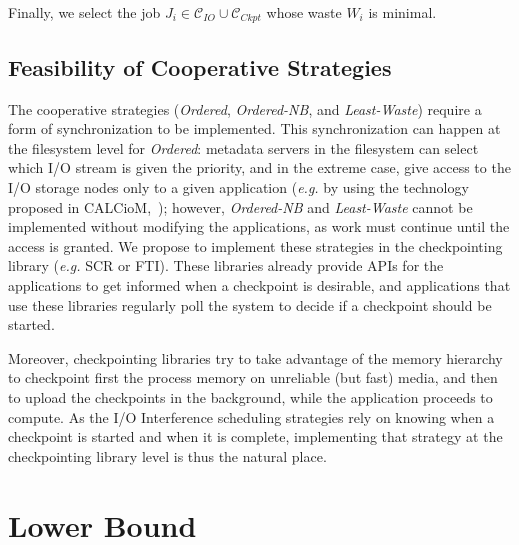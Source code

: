 \documentclass[conference,nofonttune]{IEEEtran}
\newcommand{\eg}[0]{\emph{e.g.}\xspace}
\newcommand{\wap}[1]{W_{#1}}
\newcommand{\Catiocat}{\mathcal{C}_{IO}\xspace}
\newcommand{\Catckptcat}{\mathcal{C}_{Ckpt}\xspace}
\newcommand{\fifoblock}{\emph{Ordered}\xspace}
\newcommand{\fifononblock}{\emph{Ordered-NB}\xspace}
\newcommand{\leastwaste}{\emph{Least-Waste}\xspace}
\begin{document}
Finally, we select the job $J_{i} \in \Catiocat \cup \Catckptcat$
whose waste $\wap{i}$ is minimal.

\subsection{Feasibility of Cooperative Strategies}
\label{sec:feasibility}

The cooperative strategies (\fifoblock, \fifononblock, and
\leastwaste) require a form of synchronization to be implemented. This
synchronization can happen at the filesystem level for \fifoblock:
metadata servers in the filesystem can select which I/O stream is
given the priority, and in the extreme case, give access to the I/O
storage nodes only to a given application (\eg by using the technology
proposed in CALCioM,~\cite{Dorier2015}); however, \fifononblock and
\leastwaste cannot be implemented without modifying the applications,
as work must continue until the access is granted.
We propose to implement these strategies in the checkpointing library
(\eg SCR or FTI). These libraries already provide APIs for the
applications to get informed when a checkpoint is desirable, and
applications that use these libraries regularly poll the system to
decide if a checkpoint should be started.

Moreover, checkpointing libraries try to take advantage of the memory
hierarchy to checkpoint first the process memory on unreliable (but
fast) media, and then to upload the checkpoints in the background,
while the application proceeds to compute. As the I/O Interference
scheduling strategies rely on knowing when a checkpoint is started and
when it is complete, implementing that strategy at the checkpointing
library level is thus the natural place.

%

\section{Lower Bound}
\label{sec:lowerbound}
\end{document}

